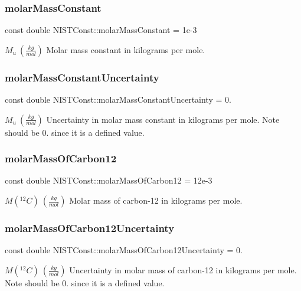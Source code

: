 \subsubsection{\texorpdfstring{molar\+Mass\+Constant}{molarMassConstant}}
{\footnotesize\ttfamily const double N\+I\+S\+T\+Const\+::molar\+Mass\+Constant = 1e-\/3}

$M_u \ (\frac{kg}{mol})$ Molar mass constant in kilograms per mole. \mbox{\label{group___molar_mass_constant_ga7aea373fd7ef8740aa22140aab339ce8}} 
\subsubsection{\texorpdfstring{molar\+Mass\+Constant\+Uncertainty}{molarMassConstantUncertainty}}
{\footnotesize\ttfamily const double N\+I\+S\+T\+Const\+::molar\+Mass\+Constant\+Uncertainty = 0.}

$M_u \ (\frac{kg}{mol})$ Uncertainty in molar mass constant in kilograms per mole. Note should be 0. since it is a defined value. \mbox{\label{group___molar_mass_constant_gab1aae3b38f21cb9a15fdc8209d3cf1f0}} 
\subsubsection{\texorpdfstring{molar\+Mass\+Of\+Carbon12}{molarMassOfCarbon12}}
{\footnotesize\ttfamily const double N\+I\+S\+T\+Const\+::molar\+Mass\+Of\+Carbon12 = 12e-\/3}

$M({^{12}C}) \ (\frac{kg}{mol})$ Molar mass of carbon-\/12 in kilograms per mole. \mbox{\label{group___molar_mass_constant_gae2fea17985c3e8877e1baab9f9382676}} 
\subsubsection{\texorpdfstring{molar\+Mass\+Of\+Carbon12\+Uncertainty}{molarMassOfCarbon12Uncertainty}}
{\footnotesize\ttfamily const double N\+I\+S\+T\+Const\+::molar\+Mass\+Of\+Carbon12\+Uncertainty = 0.}

$M({^{12}C}) \ (\frac{kg}{mol})$ Uncertainty in molar mass of carbon-\/12 in kilograms per mole. Note should be 0. since it is a defined value. 